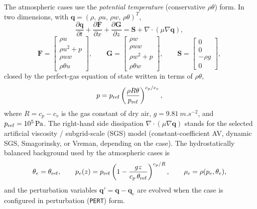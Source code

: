 \documentclass[11pt,a4paper]{article}
\begin{document}
The atmospheric cases use the \emph{potential temperature}
(conservative $\rho\theta$) form. In two dimensions, with $\bm{q} =
(\rho,\, \rho u,\, \rho w,\, \rho\theta)^{T}$,
\begin{equation}
  \frac{\partial \bm{q}}{\partial t}
  + \frac{\partial \bm{F}}{\partial x}
  + \frac{\partial \bm{G}}{\partial z}
  = \bm{S} + \nabla\cdot(\mu \nabla \bm{q}),
  \label{eq:euler-theta}
\end{equation}
\begin{equation}
  \bm{F} =
  \begin{bmatrix} \rho u \\ \rho u^2 + p \\ \rho u w \\ \rho \theta u
  \end{bmatrix},
  \qquad
  \bm{G} =
  \begin{bmatrix} \rho w \\ \rho u w \\ \rho w^2 + p \\ \rho \theta w
  \end{bmatrix},
  \qquad
  \bm{S} =
  \begin{bmatrix} 0 \\ 0 \\ -\rho g \\ 0 \end{bmatrix},
\end{equation}
closed by the perfect-gas equation of state written in terms of
$\rho\theta$,
\begin{equation}
  p = p_{\rm ref}\left( \frac{\rho R \theta}{p_{\rm ref}}
      \right)^{c_p/c_v},
  \label{eq:eos-theta}
\end{equation}
where $R = c_p - c_v$ is the gas constant of dry air, $g =
\SI{9.81}{m.s^{-2}}$, and $p_{\rm ref} = \SI{e5}{Pa}$. The right-hand
side dissipation $\nabla\cdot(\mu\nabla\bm{q})$ stands for the selected
artificial viscosity / subgrid-scale (SGS) model (constant-coefficient
AV, dynamic SGS, Smagorinsky, or Vreman, depending on the case).
The hydrostatically balanced background used by the atmospheric cases is
\begin{equation}
  \theta_e = \theta_{\rm ref},
  \qquad
  p_e(z) = p_{\rm ref}\left( 1 - \frac{g z}{c_p\,\theta_{\rm ref}}
           \right)^{c_p/R},
  \qquad
  \rho_e = \rho(p_e, \theta_e),
  \label{eq:hydrostatic}
\end{equation}
and the perturbation variables $\bm{q}' = \bm{q} - \bm{q}_e$ are evolved
when the case is configured in perturbation (\texttt{PERT}) form.
\end{document}
